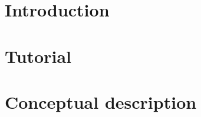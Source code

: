 \documentclass{deltares_manual}
\begin{document}


%
\chapter{Introduction}
\chapter{Tutorial}
\chapter{Conceptual description}

%


%

\end{document}
